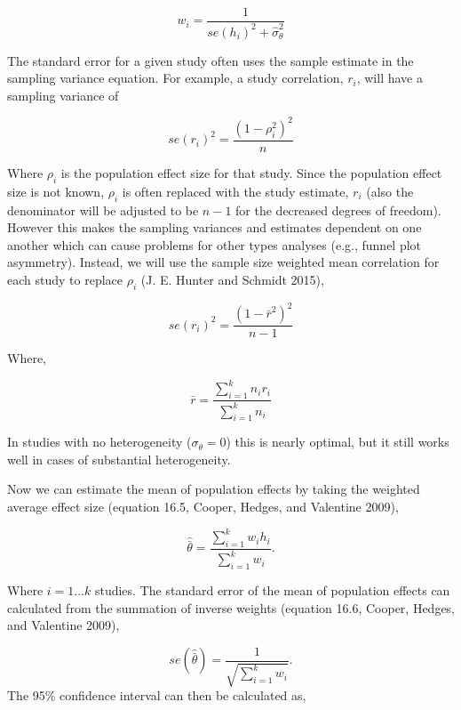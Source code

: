 \documentclass[
  letterpaper,
  DIV=11,
  numbers=noendperiod]{scrreprt}
\begin{document}
\[
w_i = \frac{1}{se(h_i)^2 + \hat{\sigma}^2_\theta}
\]

\begin{tcolorbox}[enhanced jigsaw, toptitle=1mm, titlerule=0mm, arc=.35mm, breakable, colframe=quarto-callout-tip-color-frame, title={Calculating Standard Errors}, opacitybacktitle=0.6, opacityback=0, colbacktitle=quarto-callout-tip-color!10!white, coltitle=black, bottomtitle=1mm, colback=white, bottomrule=.15mm, rightrule=.15mm, toprule=.15mm, leftrule=.75mm, left=2mm]

The standard error for a given study often uses the sample estimate in
the sampling variance equation. For example, a study correlation,
\(r_i\), will have a sampling variance of

\[
se(r_i)^2 = \frac{(1-\rho_i^2)^2}{n}
\]

Where \(\rho_i\) is the population effect size for that study. Since the
population effect size is not known, \(\rho_i\) is often replaced with
the study estimate, \(r_i\) (also the denominator will be adjusted to be
\(n-1\) for the decreased degrees of freedom). However this makes the
sampling variances and estimates dependent on one another which can
cause problems for other types analyses (e.g., funnel plot asymmetry).
Instead, we will use the sample size weighted mean correlation for each
study to replace \(\rho_i\) (J. E. Hunter and Schmidt 2015),

\[
se(r_i)^2 = \frac{\left(1-\bar{r}^2\right)^2}{n-1}
\]

Where,

\[
\bar{r} = \frac{\sum^k_{i=1}n_ir_i}{\sum^k_{i=1}n_i}
\]

In studies with no heterogeneity (\(\sigma_\theta=0\)) this is nearly
optimal, but it still works well in cases of substantial heterogeneity.

\end{tcolorbox}

Now we can estimate the mean of population effects by taking the
weighted average effect size (equation 16.5, Cooper, Hedges, and
Valentine 2009),

\[
\hat{\bar{\theta}} = \frac{\sum^k_{i=1}w_i h_i}{\sum^k_{i=1}w_i}.
\]

Where \(i=1...k\) studies. The standard error of the mean of population
effects can calculated from the summation of inverse weights (equation
16.6, Cooper, Hedges, and Valentine 2009),

\[
se(\hat{\bar{\theta}}) = \frac{1}{\sqrt{\sum^k_{i=1}w_i}}.
\] The 95\% confidence interval can then be calculated as,
\end{document}
